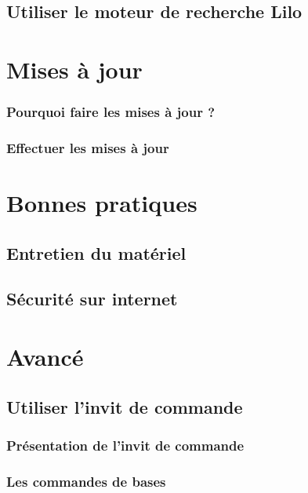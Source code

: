 \documentclass[12pt]{book}
\begin{document}
\section{Utiliser le moteur de recherche Lilo}

\chapter{Mises à jour}
	\subsection{Pourquoi faire les mises à jour ?}
	\subsection{Effectuer les mises à jour}

\chapter{Bonnes pratiques}
	\section{Entretien du matériel}
	\section{Sécurité sur internet}

\chapter{Avancé}
\section{Utiliser l'invit de commande}\label{sec:utiliserterminal}
	\subsection{Présentation de l'invit de commande}
	\subsection{Les commandes de bases}
\end{document}
